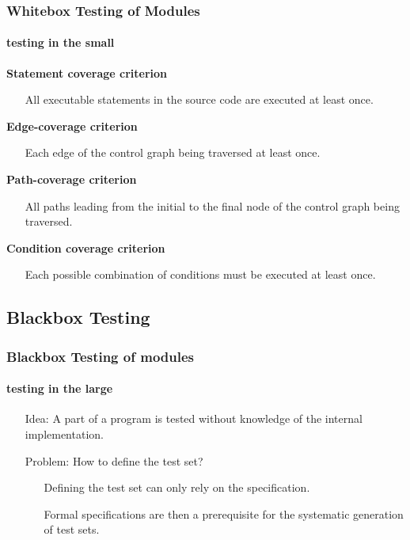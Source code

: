 \begin{frame}
\frametitle{Whitebox Testing of Modules}
\framesubtitle{testing in the small}
\begin{description}[Anwei]
  \item[Statement Coverage:] \hfill \textbf{Statement coverage criterion}
  \begin{itemize}
    \item [] \small All executable statements in the source code are executed at least once.
  \end{itemize}
  \item[Edge coverage:] \hfill \textbf{Edge-coverage criterion}
  \begin{itemize}
    \item [] \small Each edge of the control graph being traversed at least once.
  \end{itemize}
  \item[Path (Branch) Coverage:] \hfill \textbf{Path-coverage criterion}
  \begin{itemize}
    \item [] \small All paths leading from the initial to the final node of the control graph being traversed.
  \end{itemize}
  \item[(Compound) Condition Coverage:] \hfill \textbf{Condition coverage criterion}
  \begin{itemize}
    \item [] \small Each possible combination of conditions must be executed at least once.
  \end{itemize}
\end{description}
\end{frame}


\subsection{Blackbox Testing}

\begin{frame}
\frametitle{Blackbox Testing of modules}
\framesubtitle{testing in the large}
\begin{enumerate}[align=parleft]
  \item [Idea:] A part of a program is tested without knowledge of the internal implementation.
  \item [Problem:] How to define the test set? 
  \begin{itemize}
  \item [] Defining the test set can only rely on the specification.
  \item [] Formal specifications are then a prerequisite for the systematic generation of test sets.
  \end{itemize}
\end{enumerate}
\end{frame}


